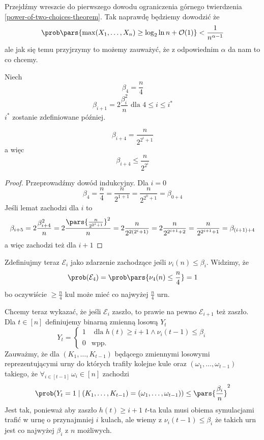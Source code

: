 Przejdźmy wreszcie do pierwszego dowodu ograniczenia górnego twierdzenia \ref{power-of-two-choices-theorem}. Tak naprawdę będziemy dowodzić że
\[
	\prob\pars{\max(X_1, \dots, X_n) \geq \log_2 \ln n + \mathcal{O}(1)} < \frac{1}{n^{\alpha - 1}}
\]
ale jak się temu przyjrzymy to możemy zauważyć, że z odpowiednim \(\alpha\) da nam to co chcemy.

Niech
\[
	\beta_4 = \frac{n}{4}
\]
\[
	\beta_{i+1} = 2\frac{\beta_i^2}{n} \text{ dla } 4 \leq i \leq i^*
\]
\(i^*\) zostanie zdefiniowane później.

\begin{lemma}
	\[
		\beta_{i+4} = \frac{n}{2^{2^i + 1}}
	\]
	a więc
	\[
		\beta_{i+4} \leq \frac{n}{2^{2^i}}
	\]
\end{lemma}
\begin{proof}
	Przeprowadźmy dowód indukcyjny. Dla \(i = 0\)
	\[
		\beta_4 = \frac{n}{4} = \frac{n}{2^{1 + 1}} = \frac{n}{2^{2^0 + 1}} = \beta_{0 + 4}
	\]
	Jeśli lemat zachodzi dla \(i\) to
	\[
		\beta_{i+5} = 2\frac{\beta_{i+4}^2}{n}
		= 2\frac{\pars{\frac{n}{2^{2^i + 1}}}^2}{n}
		= 2\frac{n}{2^{2(2^i + 1)}}
		= 2\frac{n}{2^{2^{i + 1} + 2}}
		= \frac{n}{2^{2^{i + 1} + 1}}
		= \beta_{(i + 1) + 4}
	\]
	a więc zachodzi też dla \(i + 1\)
\end{proof}

Zdefiniujmy teraz \(\mathcal{E}_i\) jako zdarzenie zachodzące jeśli \(\nu_i(n) \leq \beta_i\). Widzimy, że
\[
	\prob(\mathcal{E}_4) = \prob\pars{\nu_4(n) \leq \frac{n}{4}} = 1
\]
bo oczywiście \(\geq \frac{n}{4}\) kul może mieć co najwyżej \(\frac{n}{4}\) urn.

Chcemy teraz wykazać, że jeśli \(\mathcal{E}_i\) zaszło, to prawie na pewno \(\mathcal{E}_{i + 1}\) też zaszło. Dla \(t \in [n]\) definiujemy binarną zmienną losową \(Y_t\)
\[
	Y_t = \left\{ \begin{array}{lr} 1 & \text{ dla } h(t) \geq i + 1 \land \nu_i(t - 1) \leq \beta_i \\ 0 & \text{wpp.} \end{array} \right.
\]
Zauważmy, że dla \((K_1, \dots, K_{t - 1})\) będącego zmiennymi losowymi reprezentującymi urny do których trafiły kolejne kule oraz \((\omega_1, \dots, \omega_{t - 1})\) takiego, że \(\forall_{i \in [t - 1]} \, \omega_i \in [n]\) zachodzi
\[
	\prob(Y_t = 1 \mid (K_1, \dots, K_{t - 1}) = (\omega_1, \dots, \omega_{t - 1})) \leq \pars{\frac{\beta_i}{n}}^2
\]
Jest tak, ponieważ aby zaszło \(h(t) \geq i + 1\) \(t\)-ta kula musi obiema symulacjami trafić w urnę o przynajmniej \(i\) kulach, ale wiemy z \(\nu_i(t - 1) \leq \beta_i \) że takich urn jest co najwyżej \(\beta_i\) z \(n\) możliwych.

